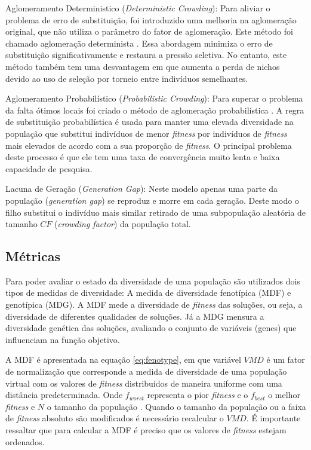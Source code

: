 Aglomeramento Deterministico (\textit{Deterministic Crowding}): Para aliviar o problema de erro de substituição, foi introduzido uma melhoria na aglomeração original, que não utiliza o parâmetro do fator de aglomeração. Este método foi chamado aglomeração determinista \cite{deterministic_crowding}. Essa abordagem minimiza o erro de substituição significativamente e restaura a pressão seletiva. No entanto, este método também tem uma desvantagem em que aumenta a perda de nichos devido ao uso de seleção por torneio entre indivíduos semelhantes.

Aglomeramento Probabilístico (\textit{Probabilistic Crowding}): Para superar o problema da falta ótimos locais foi criado o método de aglomeração probabilística \cite{probabilisti_crowding}. A regra de substituição probabilística é usada para manter uma elevada diversidade na população que substitui indivíduos de menor \textit{fitness} por indivíduos de \textit{fitness} mais elevados de acordo com a sua proporção de \textit{fitness}. O principal problema deste processo é que ele tem uma taxa de convergência muito lenta e baixa capacidade de pesquisa.

Lacuna de Geração (\textit{Generation Gap}): Neste modelo apenas uma parte da população (\textit{generation gap}) se reproduz e morre em cada geração. Deste modo o filho substitui o indivíduo mais similar retirado de uma subpopulação aleatória de tamanho $CF$ (\textit{crowding factor}) da população total. 

\subsection{Métricas}
\label{sec:evaluete_diversity}

Para poder avaliar o estado da diversidade de uma população são utilizados dois tipos de medidas de diversidade: A medida de diversidade fenotípica (MDF) e genotípica (MDG). A MDF mede a diversidade de \textit{fitness} das soluções, ou seja, a diversidade de diferentes qualidades de soluções. Já a MDG mensura a diversidade genética das soluções, avaliando o conjunto de variáveis (genes) que influenciam na função objetivo.

A MDF é apresentada na equação \ref{eq:fenotype}, em que variável $VMD$ é um fator de normalização que corresponde a medida de diversidade de uma população virtual com os valores de \textit{fitness} distribuídos de maneira uniforme com uma distância predeterminada. Onde $f_{worst}$ representa o pior \textit{fitness} e o $f_{best}$ o melhor \textit{fitness} e $N$ o tamanho da população \cite{phenotypic}. Quando o tamanho da população ou a faixa de \textit{fitness} absoluto são modificados é necessário recalcular o $VMD$. É importante ressaltar que para calcular a MDF é preciso que os valores de \textit{fitness} estejam ordenados.

